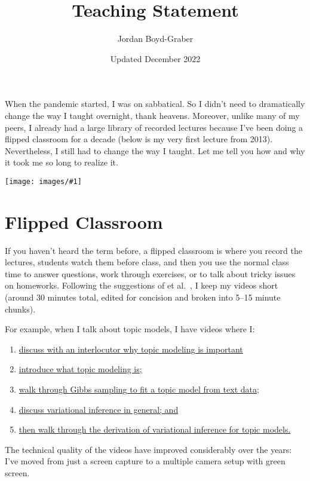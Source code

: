 \documentclass[11pt]{amsart}
\newcommand{\image}[2]{  \begin{center}
\texttt{[image: images/\#1]}
\end{center}
  }
\newcommand{\newcite}[2]{\capitalisewords{#1} et al.~\cite{#1-#2}}
\begin{document}
 \title{Teaching Statement}

 \author{Jordan Boyd-Graber}
\address{University of Maryland}

\date{Updated December 2022}

\maketitle

When the pandemic started, I was on sabbatical.  So I didn't need to
dramatically change the way I taught overnight, thank heavens.
%
Moreover, unlike many of my peers, I
already had a large library of recorded lectures because I've been
doing a flipped classroom for a decade (below is my very first lecture
from 2013).
%
Nevertheless, I still had to change the way I taught.
%
Let me tell you how and why it took me so long to realize it.

\image{first_video_lecture}{}

\section{Flipped Classroom}

If you haven't heard the term before, a flipped classroom is where you
record the lectures, students watch them before class, and then you
use the normal class time to answer questions, work through exercises,
or to talk about tricky issues on homeworks.
%
Following the
suggestions of \newcite{Zappe}{09}, I keep my videos short (around 30
minutes total, edited for concision and broken into 5--15 minute
chunks).

For example, when I talk about topic models, I have videos where I:
  \begin{enumerate}
  \item \href{https://youtu.be/qvr5J9m7Gmw}{discuss with an interlocutor why
    topic modeling is important}
  \item \href{https://www.youtube.com/watch?v=fCmIceNqVog}{introduce what
    topic modeling is;}
  \item \href{https://youtu.be/-tKmyHoVZ-g}{walk through Gibbs sampling to fit
  a topic model from text data;}
  \item \href{https://youtu.be/-tKmyHoVZ-g}{discuss variational inference in
    general; and}
  \item \href{https://youtu.be/smfWKhDcaoA}{then walk through the derivation
    of variational inference for topic models.}
  \end{enumerate}
%
The technical quality of the videos have
improved considerably over the years: I've moved from just a screen
capture to a multiple camera setup with green screen.
\end{document}
